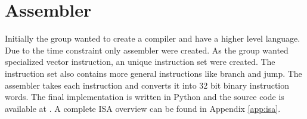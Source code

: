 \section{Assembler}
Initially the group wanted to create a compiler and have a higher level language.
Due to the time constraint only assembler were created.
As the group wanted specialized vector instruction, an unique instruction set were created.
The instruction set also contains more general instructions like branch and jump.
The assembler takes each instruction and converts it into 32 bit binary instruction words.
The final implementation is written in Python and the source code is available at \cite{assembler}.
A complete ISA overview can be found in Appendix \ref{app:isa}.
